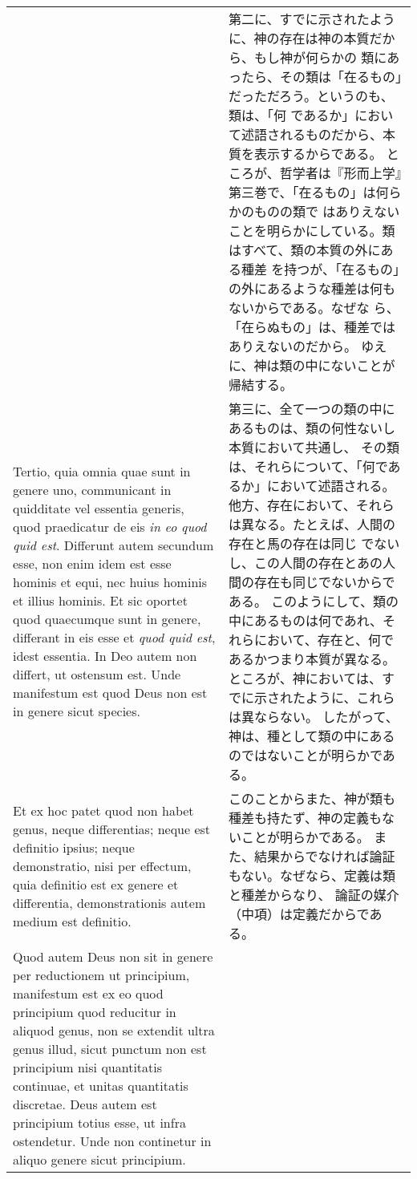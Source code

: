 \documentclass[10pt]{jsarticle} %
\begin{document}
\begin{longtable}{p{21em}p{21em}}
&

第二に、すでに示されたように、神の存在は神の本質だから、もし神が何らかの
 類にあったら、その類は「在るもの」だっただろう。というのも、類は、「何
 であるか」において述語されるものだから、本質を表示するからである。
ところが、哲学者は『形而上学』第三巻で、「在るもの」は何らかのものの類で
 はありえないことを明らかにしている。類はすべて、類の本質の外にある種差
 を持つが、「在るもの」の外にあるような種差は何もないからである。なぜな
 ら、「在らぬもの」は、種差ではありえないのだから。
ゆえに、神は類の中にないことが帰結する。

\\

Tertio, quia omnia quae sunt in genere uno, communicant in quidditate
 vel essentia generis, quod praedicatur de eis {\itshape in eo quod quid est}.
Differunt autem secundum esse, non enim idem est esse hominis et equi,
 nec huius hominis et illius hominis. 
Et sic oportet quod quaecumque sunt in genere, differant in eis esse et
 {\itshape quod quid est}, idest essentia.
In Deo autem non differt, ut ostensum est.
Unde manifestum est quod Deus non est in genere sicut species.

&

第三に、全て一つの類の中にあるものは、類の何性ないし本質において共通し、
 その類は、それらについて、「何であるか」において述語される。
他方、存在において、それらは異なる。たとえば、人間の存在と馬の存在は同じ
 でないし、この人間の存在とあの人間の存在も同じでないからである。
このようにして、類の中にあるものは何であれ、それらにおいて、存在と、何で
 あるかつまり本質が異なる。
ところが、神においては、すでに示されたように、これらは異ならない。
したがって、神は、種として類の中にあるのではないことが明らかである。

\\

Et ex hoc patet quod non habet genus, neque differentias; neque est
 definitio ipsius; neque demonstratio, nisi per effectum, quia definitio
 est ex genere et differentia, demonstrationis autem medium est
 definitio.

&
このことからまた、神が類も種差も持たず、神の定義もないことが明らかである。
 また、結果からでなければ論証もない。なぜなら、定義は類と種差からなり、
 論証の媒介（中項）は定義だからである。

\\

Quod autem Deus non sit in genere per reductionem ut principium,
 manifestum est ex eo quod principium quod reducitur in aliquod genus,
 non se extendit ultra genus illud, sicut punctum non est principium
 nisi quantitatis continuae, et unitas quantitatis discretae.
Deus autem est principium totius esse, ut infra ostendetur. Unde non
 continetur in aliquo genere sicut principium.


\end{longtable}
\end{document}
